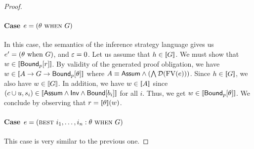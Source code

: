 \documentclass[acmsmall,screen,nonacm]{acmart}
\begin{document}
\begin{proof}
  \paragraph{Case $e = (\theta \operatorname*{\,\textsc{when}\,} G)$} In this case, the semantics of the inference strategy language gives us $e' = (\theta \operatorname{\,\text{when}\,} G)$, and $\varepsilon = 0$. Let us assume that $\historyEnv \in \sem{G}$. We must show that $\latestEnv \in \sem{\BoundWith{p}{r}}$. By validity of the generated proof obligation, we have $\latestEnv \in \sem{A \limplyI G \limplyI \BoundWith{p}{\theta}}$ where $A \equiv \mathsf{Assum} \wedge (\bigwedge \mathcal{D}(\operatorname{FV}(e)))$. Since $h \in \sem{G}$, we also have $\latestEnv \in \sem{G}$. In addition, we have $\latestEnv \in \sem{A}$ since $(c \CatValuation u, s_i) \in \sem{\Assum \land \Inv \land \BoundConj{b_i}}$ for all $i$. Thus, we get $\latestEnv \in \sem{\BoundWith{p}{\theta}}$. We conclude by observing that $r = \sem{\theta}(\latestEnv)$.
  \paragraph{Case $e = (\operatorname{\textsc{best}\,} i_1, \dots, i_n : \theta  \operatorname*{\,\textsc{when}\,} G)$} This case is very similar to the previous one.

\end{proof}
\end{document}
